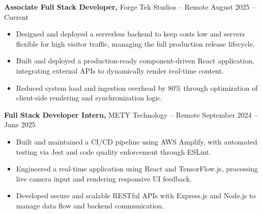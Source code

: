 \documentclass[11pt]{article}       %
\begin{document}
\textbf{Associate Full Stack Developer,} {Forge Tek Studios} -- Remote \hfill August 2025 -- Current 
\vspace{-9pt}
\begin{itemize}
  \item Designed and deployed a serverless backend to keep costs low and servers flexible for high visitor traffic, managing the full production release lifecycle.
  \item Built and deployed a production-ready component-driven React application, integrating external APIs to dynamically render real-time content.
  \item Reduced system load and ingestion overhead by 80\% through optimization of client-side rendering and synchronization logic.
\end{itemize}

\textbf{Full Stack Developer Intern,} {METY Technology} -- Remote \hfill September 2024 -- June 2025 
\vspace{-9pt}
\begin{itemize}
  \item Built and maintained a CI/CD pipeline using AWS Amplify, with automated testing via Jest and code quality enforcement through ESLint.
  \item Engineered a real-time application using React and TensorFlow.js, processing live camera input and rendering responsive UI feedback.
  \item Developed secure and scalable RESTful APIs with Express.js and Node.js to manage data flow and backend communication.
\end{itemize}

\end{document}
